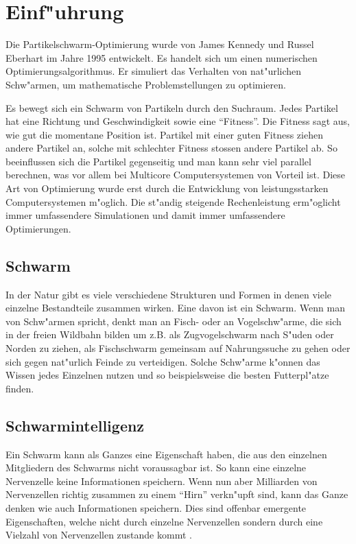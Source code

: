 \section{Einf"uhrung}
Die Partikelschwarm-Optimierung wurde von James Kennedy und
Russel Eberhart
im Jahre 1995 entwickelt. Es handelt sich um einen numerischen
Optimierungsalgorithmus. Er simuliert das Verhalten von nat"urlichen
Schw"armen, um mathematische Problemstellungen zu optimieren.

Es bewegt sich ein Schwarm von Partikeln durch den Suchraum. Jedes
Partikel hat eine Richtung und Geschwindigkeit sowie eine ``Fitness''. Die
Fitness sagt aus, wie gut die momentane Position ist. Partikel mit einer
guten Fitness ziehen andere Partikel an, solche mit schlechter Fitness
stossen andere Partikel ab. So beeinflussen sich die Partikel gegenseitig
und man kann sehr viel parallel berechnen, was vor allem bei Multicore
Computersystemen von Vorteil ist.
Diese Art von Optimierung wurde erst durch die Entwicklung von
leistungsstarken Computersystemen m"oglich. Die st"andig steigende
Rechenleistung erm"oglicht immer umfassendere Simulationen und damit
immer umfassendere Optimierungen.

\subsection{Schwarm}
In der Natur gibt es viele verschiedene Strukturen und Formen in denen
viele einzelne Bestandteile zusammen wirken. Eine davon ist ein Schwarm.
Wenn man von Schw"armen spricht, denkt man an Fisch- oder an
Vogelschw"arme, die sich in der freien Wildbahn  bilden um z.B. als
Zugvogelschwarm nach S"uden oder Norden zu ziehen, als Fischschwarm
gemeinsam auf Nahrungssuche zu gehen oder sich gegen nat"urlich Feinde zu
verteidigen. Solche Schw"arme k"onnen das Wissen jedes Einzelnen nutzen
und so beispielsweise die besten Futterpl"atze finden.

\subsection{Schwarmintelligenz}
Ein Schwarm kann als Ganzes eine Eigenschaft haben, die aus den
einzelnen Mitgliedern des Schwarms nicht voraussagbar ist. So kann
eine einzelne Nervenzelle keine Informationen speichern. Wenn nun aber
Milliarden von Nervenzellen richtig zusammen zu einem ``Hirn'' verkn"upft sind, kann das Ganze denken wie auch
Informationen speichern. Dies sind offenbar emergente Eigenschaften,
welche nicht durch einzelne Nervenzellen sondern durch eine Vielzahl
von Nervenzellen zustande kommt
\cite{partice-swarm-optimization}.

